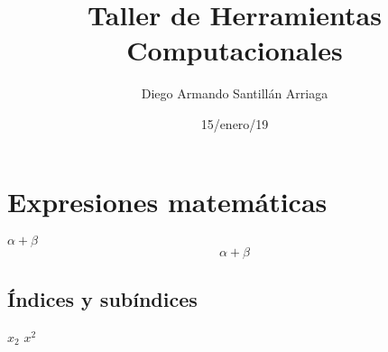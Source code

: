 \documentclass{article}
\title{\Huge Taller de Herramientas Computacionales}
\author {Diego Armando Santillán Arriaga}
\date{15/enero/19}
\begin{document}
\maketitle
	\begin{center}
	\end{center}
\newpage

\section*{Expresiones matemáticas}
$\alpha + \beta$\\ %
\[\alpha + \beta\] %

\subsection{Índices y subíndices}
$x_{2}$
$x^2$
\end{document}
